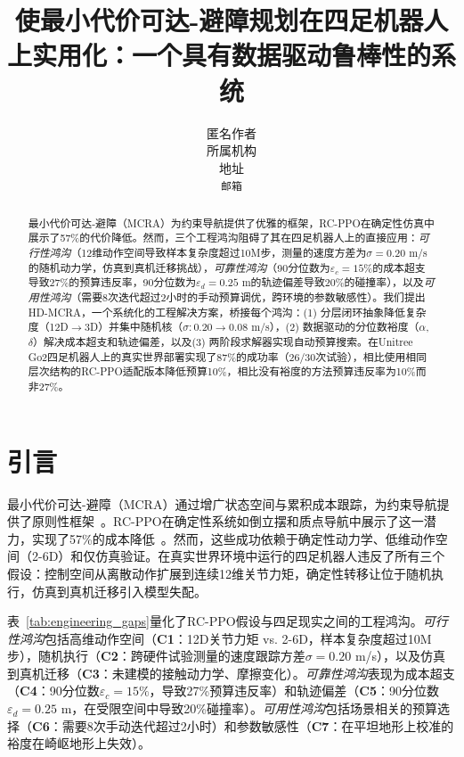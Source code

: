 \documentclass{article}
\title{使最小代价可达-避障规划在四足机器人上实用化：一个具有数据驱动鲁棒性的系统}
\author{
  匿名作者\\
  所属机构\\
  地址\\
  \texttt{邮箱}
}
\begin{document}
\maketitle

\begin{abstract}
最小代价可达-避障（MCRA）为约束导航提供了优雅的框架，RC-PPO在确定性仿真中展示了57\%的代价降低。然而，三个工程鸿沟阻碍了其在四足机器人上的直接应用：\textit{可行性鸿沟}（12维动作空间导致样本复杂度超过10M步，测量的速度方差为$\sigma=0.20$ m/s的随机动力学，仿真到真机迁移挑战），\textit{可靠性鸿沟}（90分位数为$\varepsilon_c=15\%$的成本超支导致27\%的预算违反率，90分位数为$\varepsilon_d=0.25$ m的轨迹偏差导致20\%的碰撞率），以及\textit{可用性鸿沟}（需要8次迭代超过2小时的手动预算调优，跨环境的参数敏感性）。我们提出HD-MCRA，一个系统化的工程解决方案，桥接每个鸿沟：(1) 分层闭环抽象降低复杂度（12D$\to$3D）并集中随机核（$\sigma: 0.20\to0.08$ m/s），(2) 数据驱动的分位数裕度（$\alpha$, $\delta$）解决成本超支和轨迹偏差，以及(3) 两阶段求解器实现自动预算搜索。在Unitree Go2四足机器人上的真实世界部署实现了87\%的成功率（26/30次试验），相比使用相同层次结构的RC-PPO适配版本降低预算10\%，相比没有裕度的方法预算违反率为10\%而非27\%。
\end{abstract}

\section{引言}

最小代价可达-避障（MCRA）通过增广状态空间与累积成本跟踪，为约束导航提供了原则性框架~\citep{so2024}。RC-PPO在确定性系统如倒立摆和质点导航中展示了这一潜力，实现了57\%的成本降低~\citep{so2024}。然而，这些成功依赖于确定性动力学、低维动作空间（2-6D）和仅仿真验证。在真实世界环境中运行的四足机器人违反了所有三个假设：控制空间从离散动作扩展到连续12维关节力矩，确定性转移让位于随机执行，仿真到真机迁移引入模型失配。

表~\ref{tab:engineering_gaps}量化了RC-PPO假设与四足现实之间的工程鸿沟。\textit{可行性鸿沟}包括高维动作空间（\textbf{C1}：12D关节力矩 vs. 2-6D，样本复杂度超过10M步），随机执行（\textbf{C2}：跨硬件试验测量的速度跟踪方差$\sigma=0.20$ m/s），以及仿真到真机迁移（\textbf{C3}：未建模的接触动力学、摩擦变化）。\textit{可靠性鸿沟}表现为成本超支（\textbf{C4}：90分位数$\varepsilon_c=15\%$，导致27\%预算违反率）和轨迹偏差（\textbf{C5}：90分位数$\varepsilon_d=0.25$ m，在受限空间中导致20\%碰撞率）。\textit{可用性鸿沟}包括场景相关的预算选择（\textbf{C6}：需要8次手动迭代超过2小时）和参数敏感性（\textbf{C7}：在平坦地形上校准的裕度在崎岖地形上失效）。
\end{document}
